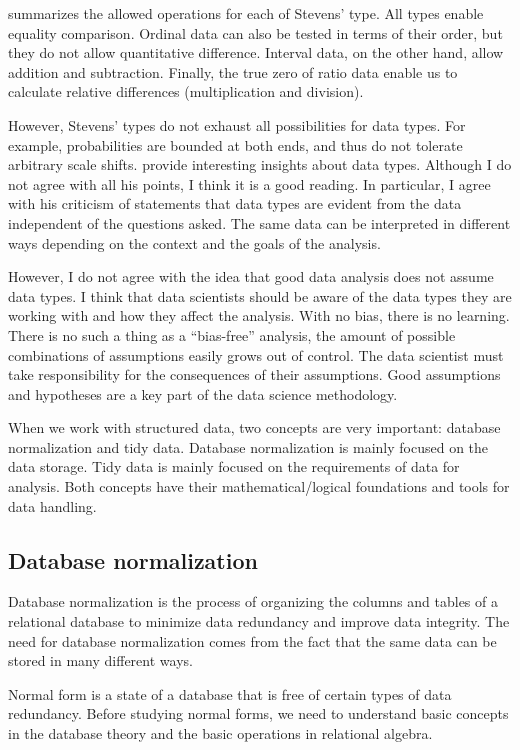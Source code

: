 summarizes the allowed operations for each of Stevens' type.  All types
enable equality comparison.  Ordinal data can also be tested in terms of their order, but
they do not allow quantitative difference.  Interval data, on the other hand, allow
addition and subtraction.  Finally, the true zero of ratio data enable us to calculate
relative differences (multiplication and division).

However, Stevens' types do not exhaust all possibilities for data types.  For example,
probabilities are bounded at both ends, and thus do not tolerate arbitrary scale shifts.
\textcite{Paul1993} provide interesting insights about data types.  Although I do not
agree with all his points, I think it is a good reading.  In particular, I agree with
his criticism of statements that data types are evident from the data independent of the
questions asked.  The same data can be interpreted in different ways depending on the
context and the goals of the analysis.

However, I do not agree with the idea that good data analysis does not assume data types.
I think that data scientists should be aware of the data types they are working with and
how they affect the analysis.  With no bias, there is no learning.  There is no such a
thing as a ``bias-free'' analysis, the amount of possible combinations of assumptions
easily grows out of control.  The data scientist must take responsibility for the
consequences of their assumptions.  Good assumptions and hypotheses are a key part of the
data science methodology.

When we work with structured data, two concepts are very important: database normalization
and tidy data.  Database normalization is mainly focused on the data storage.  Tidy data is
mainly focused on the requirements of data for analysis.  Both concepts have their
mathematical/logical foundations and tools for data handling.

\subsection{Database normalization}
\label{sec:normalization}

Database normalization is the process of organizing the columns and tables of a relational
database to minimize data redundancy and improve data integrity.  The need for database
normalization comes from the fact that the same data can be stored in many different ways.

Normal form is a state of a database that is free of certain types of data redundancy.
Before studying normal forms, we need to understand basic concepts in the database theory
and the basic operations in relational algebra.

